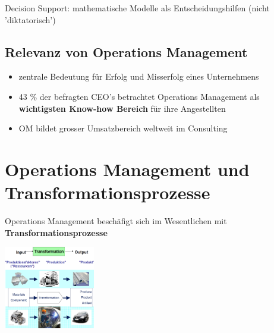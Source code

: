 \documentclass{report}
\newenvironment{Figure}
	{\par\medskip\noindent\minipage{\linewidth}}
	{\endminipage\par\medskip}
\theoremstyle{definition}
\theoremstyle{example}
\begin{document}
Decision Support: mathematische Modelle als Entscheidungshilfen (nicht 'diktatorisch')

   \subsection{Relevanz von Operations Management}
\begin{itemize}
   \item zentrale Bedeutung für Erfolg und Misserfolg eines Unternehmens
   \item 43 \% der befragten CEO's betrachtet Operations Management als \textbf{wichtigsten Know-how Bereich} für ihre Angestellten
   \item OM bildet grosser Umsatzbereich weltweit im Consulting
\end{itemize}





\section{Operations Management und Transformationsprozesse}
Operations Management beschäfigt sich im Wesentlichen mit \textbf{Transformationsprozesse}

\begin{Figure}
\centering
\includegraphics[width=150px]{img/OMTransformationsprozesse.png}
	\label{fig:Schema des Transformationsprozess}
\end{Figure}
\end{document}
